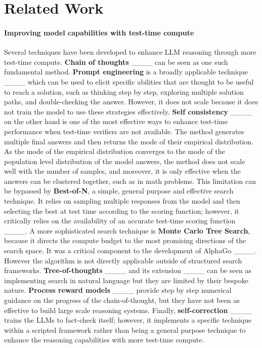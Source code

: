 \section{Related Work}
\label{sec:relatedwork}


\paragraph{Improving model capabilities with test-time compute}

Several techniques have been developed 
to enhance LLM reasoning through more test-time compute.
\textbf{Chain of thoughts} ____ 
can be seen as one such fundamental method. 
\textbf{Prompt engineering} is a broadly applicable technique ____
 which can be used to elicit specific abilities 
that are thought to be useful to reach a solution, 
such as thinking step by step, 
exploring multiple solution paths, and double-checking the answer. 
However, it does not scale because it does not train the model to use these strategies effectively.
\textbf{Self consistency} ____ on the other hand is one of the most
effective ways to enhance test-time performance when test-time verifiers 
are not available. 
The method generates multiple final answers 
and then returns the mode of their empirical distribution.
As the mode of the empirical distribution converges 
to the mode of the population level distribution of the model answers, 
the method does not scale well with the number of samples, 
and moreover, it is only effective when the answers
can be clustered together, such as in math problems.
This limitation can be bypassed by \textbf{Best-of-N}, a simple, general purpose and effective search technique.
It relies on sampling multiple responses from the model and then 
selecting the best at test time according to the scoring function; 
however, it critically relies on the availability of an accurate 
test-time scoring function ____.
A more sophisticated search technique is \textbf{Monte Carlo Tree Search}, because it directs the compute budget 
to the most promising directions of the search space.
It was a critical component to the development of AlphaGo ____.
However the algorithm is not directly applicable outside of structured search frameworks.
\textbf{Tree-of-thoughts} ____ and its extension ____
can be seen as implementing search in natural language but they are limited by their bespoke nature.
\textbf{Process reward models} 
____ provide step by step numerical guidance on the progress of the chain-of-thought, but they have not been as effective to build large scale reasoning systems.
Finally, \textbf{self-correction} 
____
trains the LLMs 
to fact-check itself; 
however, it implements a specific technique within a scripted framework
rather than being a general purpose technique to enhance 
the reasoning capabilities with more test-time compute.

